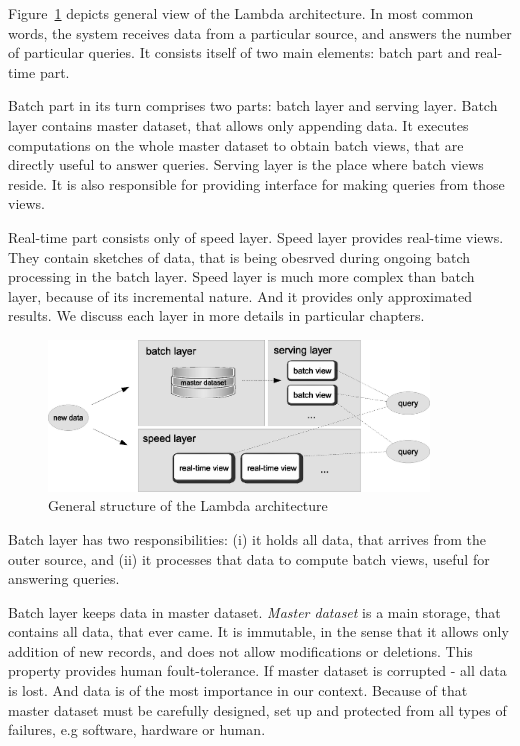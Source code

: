 
Figure~\ref{fig:lambda_architecture} depicts general view of the Lambda
architecture.
In most common words, the system receives data from a particular source, and
answers the number of particular queries.
It consists itself of two main elements: batch part and real-time part.

Batch part in its turn comprises two parts: batch layer and serving layer.
Batch layer contains master dataset, that allows only appending data.
It executes computations on the whole master dataset to obtain batch views,
that are directly useful to answer queries.
Serving layer is the place where batch views reside.
It is also responsible for providing interface for making queries from those views.

Real-time part consists only of speed layer.  
Speed layer provides real-time views.
They contain sketches of data, that is being obesrved during ongoing batch
processing in the batch layer.
Speed layer is much more complex than batch layer, because of its incremental
nature.
And it provides only approximated results.
We discuss each layer in more details in particular chapters.

\begin{figure}[H]
  \centering
  \includegraphics [width=0.9\textwidth]{images/LambdaArchitecture}
  \caption{General structure of the Lambda architecture}
  \label{fig:lambda_architecture}
\end{figure}


Batch layer has two responsibilities: (i) it holds all data, that arrives from
the outer source, and (ii) it processes that data to compute batch views, useful
for answering queries.

Batch layer keeps data in master dataset.
\textit{Master dataset}  is a main storage, that contains
all data, that ever came.
It is immutable, in the sense that it allows only addition of new records, and
does not allow modifications or deletions.
This property provides human foult-tolerance.
If master dataset is corrupted - all data is lost.
And data is of the most importance in our context.
Because of that master dataset must be carefully designed, set up and protected
from all types of failures, e.g software, hardware or human.

